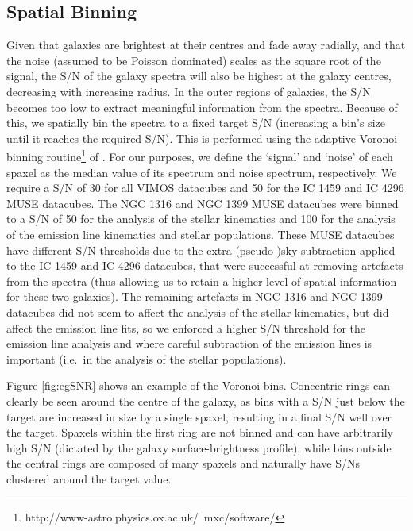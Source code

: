 	\subsection{Spatial Binning}
		\label{subsec:Binning}
		Given that galaxies are brightest at their centres and fade away radially, and that the noise (assumed to be Poisson dominated) scales as the square root of the signal, the S/N of the galaxy spectra will also be highest at the galaxy centres, decreasing with increasing radius. In the outer regions of galaxies, the S/N becomes too low to extract meaningful information from the spectra. Because of this, we spatially bin the spectra to a fixed target S/N (increasing a bin's size until it reaches the required S/N). This is performed using the adaptive Voronoi binning routine\footnote{http://www-astro.physics.ox.ac.uk/~mxc/software/} of \citet{Cappellari2003}. For our purposes, we define the `signal' and `noise' of each spaxel as the median value of its spectrum and noise spectrum, respectively. We require a S/N of 30 for all VIMOS datacubes and 50 for the IC 1459 and IC 4296 MUSE datacubes. The NGC 1316 and NGC 1399 MUSE datacubes were binned to a S/N of 50 for the analysis of the stellar kinematics and 100 for the analysis of the emission line kinematics and stellar populations. These MUSE datacubes have different S/N thresholds due to the extra (pseudo-)sky subtraction applied to the IC 1459 and IC 4296 datacubes, that were successful at removing artefacts from the spectra (thus allowing us to retain a higher level of spatial information for these two galaxies). The remaining artefacts in NGC 1316 and NGC 1399 datacubes did not seem to affect the analysis of the stellar kinematics, but did affect the emission line fits, so we enforced a higher S/N threshold for the emission line analysis and where careful subtraction of the emission lines is important (i.e.\ in the analysis of the stellar populations). 

		Figure \ref{fig:egSNR} shows an example of the Voronoi bins. Concentric rings can clearly be seen around the centre of the galaxy, as bins with a S/N just below the target are increased in size by a single spaxel, resulting in a final S/N well over the target. Spaxels within the first ring are not binned and can have arbitrarily high S/N (dictated by the galaxy surface-brightness profile), while bins outside the central rings are composed of many spaxels and naturally have S/Ns clustered around the target value.

